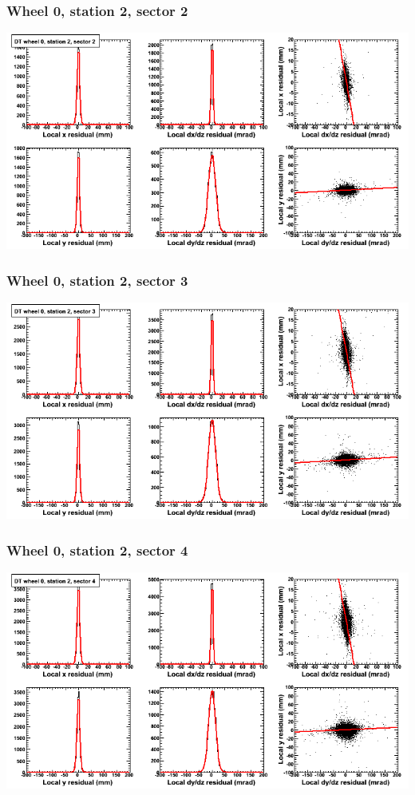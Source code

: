 \documentclass[compress]{beamer}
\begin{document}
\begin{frame}
\frametitle{Wheel 0, station 2, sector 2}
\includegraphics[width=\linewidth]{tmpbell_MBwhCst2sec02.png}
\end{frame}

\begin{frame}
\frametitle{Wheel 0, station 2, sector 3}
\includegraphics[width=\linewidth]{tmpbell_MBwhCst2sec03.png}
\end{frame}

\begin{frame}
\frametitle{Wheel 0, station 2, sector 4}
\includegraphics[width=\linewidth]{tmpbell_MBwhCst2sec04.png}
\end{frame}
\end{document}
